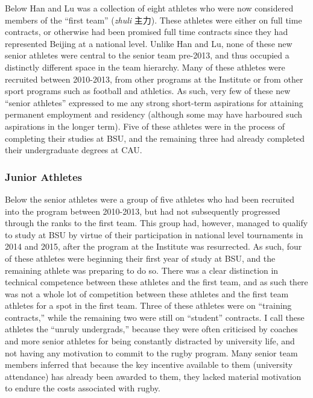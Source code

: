 \begin{CJK}{UTF8}{gbsn}
Below Han and Lu was a collection of eight athletes who were now considered members of the ``first team'' (\textit{zhuli} 主力).   These athletes were either on full time contracts, or otherwise had been promised full time contracts since they had represented Beijing at a national level.  Unlike Han and Lu, none of these new senior athletes were central to the senior team pre-2013, and thus occupied a distinctly different space in the team hierarchy.  Many of these athletes were recruited between 2010-2013, from other programs at the Institute or from other sport programs such as football and athletics.  As such, very few of these new ``senior athletes'' expressed to me any strong short-term aspirations for attaining permanent employment and residency (although some may have harboured such aspirations in the longer term). Five of these athletes were in the process of completing their studies at BSU, and the remaining three had already completed their undergraduate degrees at CAU.

\subsubsection{Junior Athletes}


Below the senior athletes were a group of five athletes who had been recruited into the program between 2010-2013, but had not subsequently progressed through the ranks to the first team. This group had, however, managed to qualify to study at BSU by virtue of their participation in national level tournaments in 2014 and 2015, after the program at the Institute was resurrected.  As such, four of these athletes were beginning their first year of study at BSU, and the remaining athlete was preparing to do so. There was a clear distinction in technical competence between these athletes and the first team, and as such there was not a whole lot of competition between these athletes and the first team athletes for a spot in the first team.  Three of these athletes were on ``training contracts,'' while the remaining two were still on ``student'' contracts.  I call these athletes the ``unruly undergrads,'' because they were often criticised by coaches and more senior athletes for being constantly distracted by university life, and not having any motivation to commit to the rugby program.  Many senior team members inferred that because the key incentive available to them (university attendance) has already been awarded to them, they lacked material motivation to endure the costs associated with rugby.



\end{CJK}
